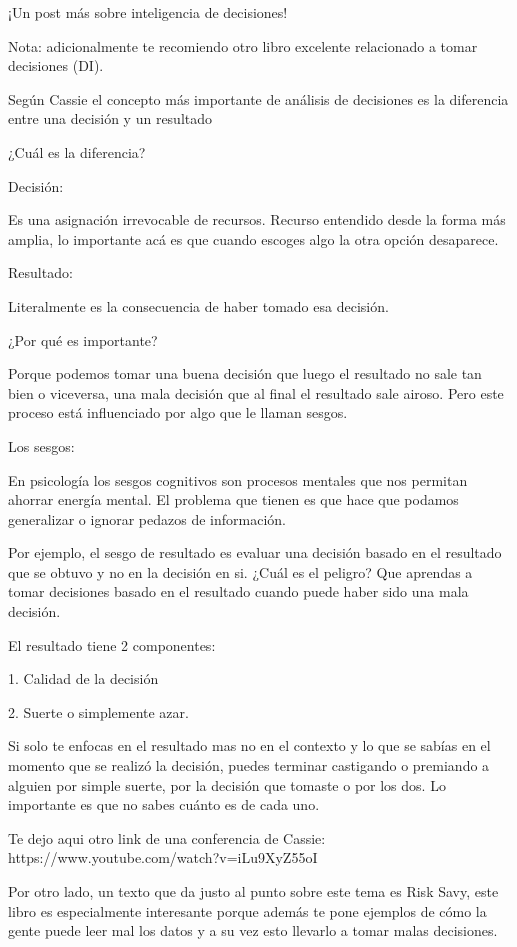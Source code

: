 ¡Un post más sobre inteligencia de decisiones!


Nota: adicionalmente te recomiendo otro libro excelente relacionado a tomar decisiones (DI).


Según Cassie el concepto más importante de análisis de decisiones es la diferencia entre una decisión y un resultado


¿Cuál es la diferencia?


Decisión:


Es una asignación irrevocable de recursos. Recurso entendido desde la forma más amplia, lo importante acá es que cuando escoges algo la otra opción desaparece. 


Resultado: 


Literalmente es la consecuencia de haber tomado esa decisión.


¿Por qué es importante? 


Porque podemos tomar una buena decisión que luego el resultado no sale tan bien o viceversa, una mala decisión que al final el resultado sale airoso. Pero este proceso está influenciado por algo que le llaman sesgos. 


Los sesgos:


En psicología los sesgos cognitivos son procesos mentales que nos permitan ahorrar energía mental. El problema que tienen es que hace que podamos generalizar o ignorar pedazos de información. 


Por ejemplo, el sesgo de resultado es evaluar una decisión basado en el resultado que se obtuvo y no en la decisión en si. ¿Cuál es el peligro? Que aprendas a tomar decisiones basado en el resultado cuando puede haber sido una mala decisión. 


El resultado tiene 2 componentes:


1. Calidad de la decisión 

2. Suerte o simplemente azar. 


Si solo te enfocas en el resultado mas no en el contexto y lo que se sabías en el momento que se realizó la decisión, puedes terminar castigando o premiando a alguien por simple suerte, por la decisión que tomaste o por los dos. Lo importante es que no sabes cuánto es de cada uno. 


Te dejo aqui otro link de una conferencia de Cassie: https://www.youtube.com/watch?v=iLu9XyZ55oI


Por otro lado, un texto que da justo al punto sobre este tema es Risk Savy, este libro es especialmente interesante porque además te pone ejemplos de cómo la gente puede leer mal los datos y a su vez esto llevarlo a tomar malas decisiones. 

